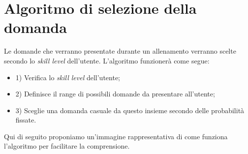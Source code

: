 \section{Algoritmo di selezione della domanda}
Le domande che verranno presentate durante un allenamento verranno scelte secondo lo \textit{skill level} dell'utente. L'algoritmo funzionerà come segue:
\begin{itemize}
	\item 1) Verifica lo \textit{skill level} dell'utente;
	\item 2) Definisce il range di possibili domande da presentare all'utente;
	\item 3) Sceglie una domanda casuale da questo insieme secondo delle probabilità fissate.
\end{itemize}
Qui di seguito proponiamo un'immagine rappresentativa di come funziona l'algoritmo per facilitare la comprensione.


